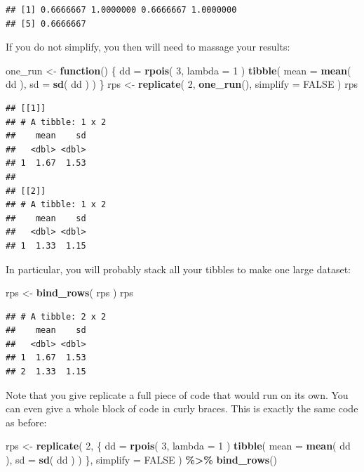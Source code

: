 \documentclass[
]{book}
\newenvironment{Shaded}{\begin{snugshade}}{\end{snugshade}}
\newcommand{\AttributeTok}[1]{\textcolor[rgb]{0.13,0.29,0.53}{#1}}
\newcommand{\ConstantTok}[1]{\textcolor[rgb]{0.56,0.35,0.01}{#1}}
\newcommand{\ControlFlowTok}[1]{\textcolor[rgb]{0.13,0.29,0.53}{\textbf{#1}}}
\newcommand{\DecValTok}[1]{\textcolor[rgb]{0.00,0.00,0.81}{#1}}
\newcommand{\FunctionTok}[1]{\textcolor[rgb]{0.13,0.29,0.53}{\textbf{#1}}}
\newcommand{\NormalTok}[1]{#1}
\newcommand{\OtherTok}[1]{\textcolor[rgb]{0.56,0.35,0.01}{#1}}
\newcommand{\SpecialCharTok}[1]{\textcolor[rgb]{0.81,0.36,0.00}{\textbf{#1}}}
\begin{document}
\begin{verbatim}
## [1] 0.6666667 1.0000000 0.6666667 1.0000000
## [5] 0.6666667
\end{verbatim}

If you do not simplify, you then will need to massage your results:

\begin{Shaded}
\begin{Highlighting}[]
\NormalTok{one\_run }\OtherTok{\textless{}{-}} \ControlFlowTok{function}\NormalTok{() \{}
\NormalTok{  dd }\OtherTok{=} \FunctionTok{rpois}\NormalTok{( }\DecValTok{3}\NormalTok{, }\AttributeTok{lambda =} \DecValTok{1}\NormalTok{ )}
  \FunctionTok{tibble}\NormalTok{( }\AttributeTok{mean =} \FunctionTok{mean}\NormalTok{( dd ), }\AttributeTok{sd =} \FunctionTok{sd}\NormalTok{( dd ) )}
\NormalTok{\}}
\NormalTok{rps }\OtherTok{\textless{}{-}} \FunctionTok{replicate}\NormalTok{( }\DecValTok{2}\NormalTok{, }\FunctionTok{one\_run}\NormalTok{(), }\AttributeTok{simplify =} \ConstantTok{FALSE}\NormalTok{ )}
\NormalTok{rps}
\end{Highlighting}
\end{Shaded}

\begin{verbatim}
## [[1]]
## # A tibble: 1 x 2
##    mean    sd
##   <dbl> <dbl>
## 1  1.67  1.53
## 
## [[2]]
## # A tibble: 1 x 2
##    mean    sd
##   <dbl> <dbl>
## 1  1.33  1.15
\end{verbatim}

In particular, you will probably stack all your tibbles to make one large dataset:

\begin{Shaded}
\begin{Highlighting}[]
\NormalTok{rps }\OtherTok{\textless{}{-}} \FunctionTok{bind\_rows}\NormalTok{( rps )}
\NormalTok{rps}
\end{Highlighting}
\end{Shaded}

\begin{verbatim}
## # A tibble: 2 x 2
##    mean    sd
##   <dbl> <dbl>
## 1  1.67  1.53
## 2  1.33  1.15
\end{verbatim}

Note that you give replicate a full piece of code that would run on its own. You can even give a whole block of code in curly braces.
This is exactly the same code as before:

\begin{Shaded}
\begin{Highlighting}[]
\NormalTok{rps }\OtherTok{\textless{}{-}} \FunctionTok{replicate}\NormalTok{( }\DecValTok{2}\NormalTok{, \{}
\NormalTok{  dd }\OtherTok{=} \FunctionTok{rpois}\NormalTok{( }\DecValTok{3}\NormalTok{, }\AttributeTok{lambda =} \DecValTok{1}\NormalTok{ )}
  \FunctionTok{tibble}\NormalTok{( }\AttributeTok{mean =} \FunctionTok{mean}\NormalTok{( dd ), }\AttributeTok{sd =} \FunctionTok{sd}\NormalTok{( dd ) )}
\NormalTok{\}, }\AttributeTok{simplify =} \ConstantTok{FALSE}\NormalTok{ ) }\SpecialCharTok{\%\textgreater{}\%}
  \FunctionTok{bind\_rows}\NormalTok{()}
\end{Highlighting}
\end{Shaded}
\end{document}
